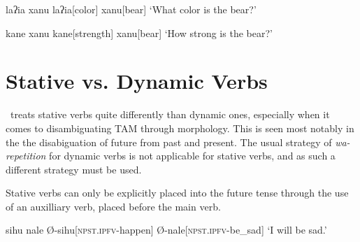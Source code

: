 \begin{paracol}{2}
\ex
\begingl
\glpreamble laʔia xanu
\endpreamble
laʔia[color]
xanu[bear]
\glft `What color is the bear?'
\endgl
\xe
\switchcolumn

\ex
\begingl
\glpreamble kane xanu
\endpreamble
kane[strength]
xanu[bear]
\glft `How strong is the bear?'
\endgl
\xe
\end{paracol}



\section{Stative vs. Dynamic Verbs}
\label{sec:stative}
\langname\ treats stative verbs quite differently than dynamic ones, especially when it comes to disambiguating TAM through morphology. This is seen most notably in the the disabiguation of future from past and present. The usual strategy of \textit{wa-repetition} for dynamic verbs is not applicable for stative verbs, and as such a different strategy must be used.

Stative verbs can only be explicitly placed into the future tense through the use of an auxilliary verb,  placed before the main verb.

\ex
\begingl
\glpreamble sihu nale
\endpreamble
Ø-sihu[\textsc{npst.ipfv-}happen]
Ø-nale[\textsc{npst.ipfv-}be\_sad]
\glft `I will be sad.'
\endgl
\xe